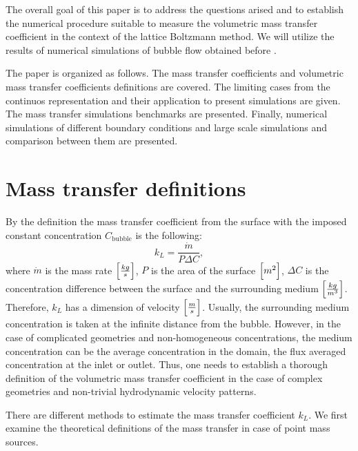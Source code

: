 \documentclass{article}
\newcommand{\beq}{\begin{equation}}
\newcommand{\feq}{\end{equation}}
\newcommand{\cbubble}{C_{\mathrm{bubble}}}
\begin{document}
The overall goal of this paper is to address the questions arised and to establish the numerical
procedure suitable to measure the volumetric mass transfer coefficient in the context of the
lattice Boltzmann method. We will utilize the results of numerical simulations of bubble flow
obtained
before \cite{kuzmin-binary2d,kuzmin-binary3d}. 

The paper is organized as follows. The mass transfer coefficients and volumetric mass transfer
coefficients definitions are covered. The limiting cases from the continuos representation and their
application to present simulations are given. The mass transfer simulations benchmarks are
presented. Finally, numerical simulations of different boundary conditions and large scale
simulations and comparison between them are presented. 

\section{Mass transfer definitions}
By the definition the mass transfer coefficient from the surface with the imposed constant
concentration $\cbubble$ is the following:
\beq
k_L=\frac{\dot{m}}{P \Delta C},
\feq
where $\dot{m}$ is the mass rate $\Bigl[\frac{kg}{s}\Bigr]$, $P$ is the area of the surface
$\Bigl[m^2\Bigr]$, $\Delta C$ is the concentration difference between the surface and the surrounding medium
$\Bigl[\frac{kg}{m^3}\Bigr]$. Therefore, $k_L$ has a dimension of velocity
$\Bigl[\frac{m}{s}\Bigr]$. Usually, the surrounding medium concentration is taken at the infinite distance
from the bubble. However, in the case of complicated geometries and non-homogeneous concentrations, 
the medium concentration can be the average concentration in the domain, the flux averaged
concentration at the inlet or outlet. Thus, one needs to establish a thorough definition of the volumetric
mass transfer coefficient in the case of complex geometries and non-trivial hydrodynamic velocity patterns.

There are different methods to estimate the mass transfer coefficient $k_L$. We first examine the
theoretical definitions of the mass transfer in case of point mass sources.
\end{document}
